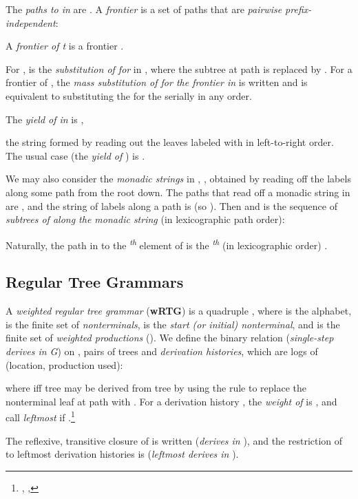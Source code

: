 \documentclass[english]{article}
\newcommand\comment[1]{}
\newcommand{\nth}[2]{#1\textsuperscript{\textit{#2}}}
\newcommand\cls[1]{\textbf{#1}}
\begin{document}
The \emph{paths to  in } are .
A \emph{frontier} is a set of paths  that are \emph{pairwise
  prefix-independent}:



A \emph{frontier of t} is a frontier .

For ,  is the
\emph{substitution of  for } in , where the subtree at path  is
replaced by . For a frontier  of , the \emph{mass substitution of 
  for the frontier  in } is written  and
is equivalent to substituting the  for the  serially in any order.


The \emph{yield of  in}  is ,
\comment{
  the concatenation (in lexicographic order\footnote{, ,  }) over paths
  to leaves  (such that ) of
  ---that is,
}
the string formed by reading out the leaves
labeled with  in left-to-right order.
The usual case (the \emph{yield of
  }) is .

We may also consider the \emph{monadic strings} in , , obtained by reading off the
labels along some path from the root down.
The paths that read off a monadic string  in  are , and the string of labels along a path is
 (so ).  Then  and
 is the sequence of \emph{subtrees of  along the monadic
  string } (in lexicographic path order):

Naturally, the path in  to the \nth{}{th} element of  is
the \nth{}{th} (in lexicographic order) .

\comment{
The \emph{-labeled-children of } are contained in the subsequence
:

}

\subsection{Regular Tree Grammars}

A \emph{weighted regular tree grammar} (\cls{wRTG})  is a quadruple
  , where  is the alphabet,  is the finite set of
  \emph{nonterminals},  is the \emph{start (or initial) nonterminal},
  and \emph{} is the
  finite set of \emph{weighted productions} ().
  We define the binary relation  (\emph{single-step derives in G})
  on , pairs of trees and \emph{derivation histories}, which are logs of (location, production used):



where  iff tree  may be derived
  from tree  by using the rule  to replace the nonterminal
  leaf  at path  with .  For a derivation history
  , the \emph{weight of } is , and call  \emph{leftmost} if .\footnote{, ,  }

  The reflexive, transitive closure of
   is written  (\emph{derives in }), and
  the restriction of  to leftmost derivation histories is
   (\emph{leftmost derives in }).
\end{document}

